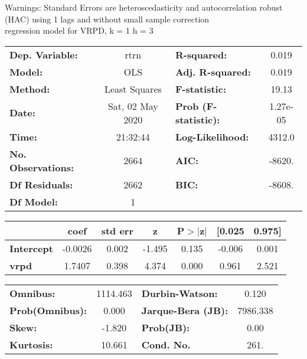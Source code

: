 Warnings: \newline
 [1] Standard Errors are heteroscedasticity and autocorrelation robust (HAC) using 1 lags and without small sample correction\\ 

regression model for VRPD, k = 1 h = 3\begin{center}
\begin{tabular}{lclc}
\toprule
\textbf{Dep. Variable:}    &       rtrn       & \textbf{  R-squared:         } &     0.019   \\
\textbf{Model:}            &       OLS        & \textbf{  Adj. R-squared:    } &     0.019   \\
\textbf{Method:}           &  Least Squares   & \textbf{  F-statistic:       } &     19.13   \\
\textbf{Date:}             & Sat, 02 May 2020 & \textbf{  Prob (F-statistic):} &  1.27e-05   \\
\textbf{Time:}             &     21:32:44     & \textbf{  Log-Likelihood:    } &    4312.0   \\
\textbf{No. Observations:} &        2664      & \textbf{  AIC:               } &    -8620.   \\
\textbf{Df Residuals:}     &        2662      & \textbf{  BIC:               } &    -8608.   \\
\textbf{Df Model:}         &           1      & \textbf{                     } &             \\
\bottomrule
\end{tabular}
\begin{tabular}{lcccccc}
                   & \textbf{coef} & \textbf{std err} & \textbf{z} & \textbf{P$> |$z$|$} & \textbf{[0.025} & \textbf{0.975]}  \\
\midrule
\textbf{Intercept} &      -0.0026  &        0.002     &    -1.495  &         0.135        &       -0.006    &        0.001     \\
\textbf{vrpd}      &       1.7407  &        0.398     &     4.374  &         0.000        &        0.961    &        2.521     \\
\bottomrule
\end{tabular}
\begin{tabular}{lclc}
\textbf{Omnibus:}       & 1114.463 & \textbf{  Durbin-Watson:     } &    0.120  \\
\textbf{Prob(Omnibus):} &   0.000  & \textbf{  Jarque-Bera (JB):  } & 7986.338  \\
\textbf{Skew:}          &  -1.820  & \textbf{  Prob(JB):          } &     0.00  \\
\textbf{Kurtosis:}      &  10.661  & \textbf{  Cond. No.          } &     261.  \\
\bottomrule
\end{tabular}
\end{center}

